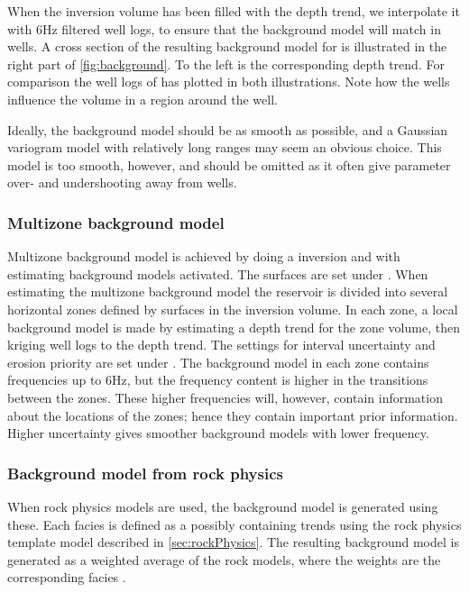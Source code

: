 When the inversion volume has been filled with the depth trend, we
interpolate it with 6Hz filtered well logs, to ensure that the
background model will match in wells. A cross section of the resulting
background model for \vp is illustrated in the right part of
\autoref{fig:background}. To the left is the corresponding depth
trend. For comparison the well logs of \vp has plotted in both
illustrations. Note how the wells influence the volume in a region
around the well.

Ideally, the background model should be as smooth as possible,
and a Gaussian variogram model with relatively long ranges may seem an
obvious choice. This model is too smooth, however, and should be
omitted as it often give parameter over- and undershooting away
from wells.

\subsubsection{Multizone background model}
Multizone background model is achieved by doing a  inversion and with estimating background models activated. The surfaces are set under . When estimating the multizone background model the reservoir is divided into several horizontal zones defined by surfaces in the inversion volume. In each zone, a local background model is made by estimating a depth trend for the zone volume, then kriging well logs to the depth trend. The settings for interval uncertainty and erosion priority are set under . The background model in each zone contains frequencies up to 6Hz, but the frequency content is higher in the transitions between the zones. These higher frequencies will, however, contain information about the locations of the zones; hence they contain important prior information. Higher uncertainty gives smoother background models with lower frequency.

\subsubsection{Background model from rock physics}
When rock physics models are used, the background model is generated using these. Each facies is defined as a  possibly containing trends using the rock physics template model described in \autoref{sec:rockPhysics}. The resulting background model is generated as a weighted average of the rock models, where the weights are the corresponding facies . 

